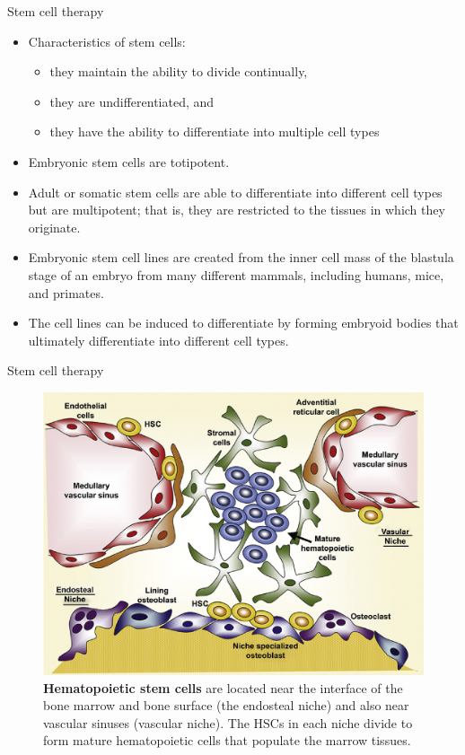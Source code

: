 \documentclass[ignorenonframetext,aspectratio=169]{beamer}
\providecommand{\tightlist}{%
  \setlength{\itemsep}{0pt}\setlength{\parskip}{0pt}}
\begin{document}
\begin{frame}{Stem cell therapy}
\protect\hypertarget{stem-cell-therapy}{}

\begin{itemize}
\tightlist
\item
  Characteristics of stem cells:

  \begin{itemize}
  \tightlist
  \item
    they maintain the ability to divide continually,
  \item
    they are undifferentiated, and
  \item
    they have the ability to differentiate into multiple cell types
  \end{itemize}
\item
  Embryonic stem cells are totipotent.
\item
  Adult or somatic stem cells are able to differentiate into different
  cell types but are multipotent; that is, they are restricted to the
  tissues in which they originate.
\item
  Embryonic stem cell lines are created from the inner cell mass of the
  blastula stage of an embryo from many different mammals, including
  humans, mice, and primates.
\item
  The cell lines can be induced to differentiate by forming embryoid
  bodies that ultimately differentiate into different cell types.
\end{itemize}

\end{frame}

\begin{frame}{Stem cell therapy}
\protect\hypertarget{stem-cell-therapy-1}{}

\begin{figure}
\includegraphics[width=0.45\linewidth]{../images/hematopoietic_stem_cells} \caption{\textbf{Hematopoietic stem cells} are located near the interface of the bone marrow and bone surface (the endosteal niche) and also near vascular sinuses (vascular niche). The HSCs in each niche divide to form mature hematopoietic cells that populate the marrow tissues.}\label{fig:stem-cell-therapy}
\end{figure}

\end{frame}
\end{document}
